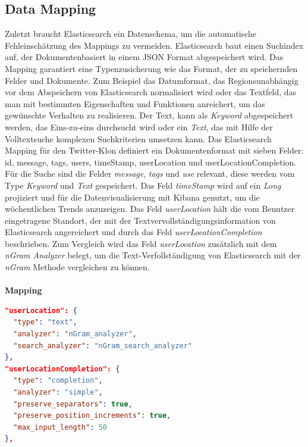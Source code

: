 \subsection{Data Mapping}
Zuletzt braucht Elasticsearch ein Datenschema, um die automatische Fehleinschätzung des Mappings zu vermeiden. 
Elasticsearch baut einen Suchindex auf, der Dokumentenbasiert in einem JSON Format abgespeichert wird. Das Mapping garantiert eine Typenzusicherung wie das Format, der zu speichernden Felder und Dokumente. Zum Beispiel das Datumformat, das Regionsunabhängig vor dem Abspeichern von Elasticsearch normalisiert wird oder das Textfeld, das man mit bestimmten Eigenschaften und Funktionen anreichert, um das gewünschte Verhalten zu realisieren. 
Der Text, kann als \textit{Keyword} abgespeichert werden, das Eins-zu-eins durchsucht wird oder ein \textit{Text}, das mit Hilfe der Volltextsuche komplexen Suchkriterien umsetzen kann.
Das Elasticsearch Mapping für den Twitter-Klon definiert ein Dokumentenformat mit sieben Felder: id, message, tags, users, timeStamp, userLocation und userLocationCompletion. Für die Suche sind die Felder \textit{message}, \textit{tags} und \textit{use} relevant, diese werden vom Type \textit{Keyword} und \textit{Text} gespeichert. Das Feld \textit{timeStamp} wird auf ein \textit{Long} projiziert und für die Datenvisualisierung mit Kibana genutzt, um die wöchentlichen Trends anzuzeigen. Das Feld \textit{userLocation} hält die vom Benutzer eingetragene Standort, der mit der Textvervollständigungsinformation von Elasticsearch angereichert und durch das Feld \textit{userLocationCompletion} beschrieben. Zum Vergleich wird das Feld \textit{userLocation}  zusätzlich mit dem \textit{nGram Analyzer} belegt, um die Text-Verfollständigung von Elasticsearch mit der \textit{nGram} Methode vergleichen zu können.  
\\\\
\textbf{Mapping}
\begin{lstlisting}[language=json,firstnumber=1]
"userLocation": {
  "type": "text",
  "analyzer": "nGram_analyzer",
  "search_analyzer": "nGram_search_analyzer"
},
"userLocationCompletion": {
  "type": "completion",
  "analyzer": "simple",
  "preserve_separators": true,
  "preserve_position_increments": true,
  "max_input_length": 50
},
\end{lstlisting}


